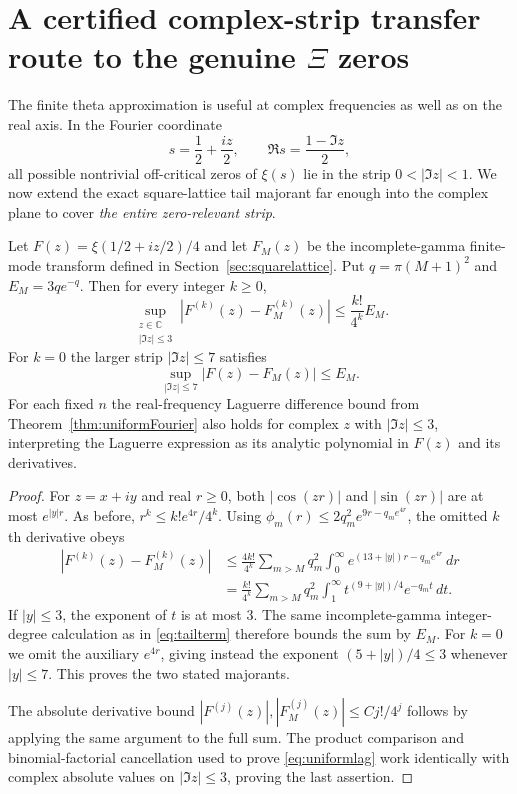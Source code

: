\section{A certified complex-strip transfer route to the genuine $\Xi$ zeros}
\label{sec:complexstrip}
The finite theta approximation is useful at complex
frequencies as well as on the real axis. In the
Fourier coordinate
\[
s=\frac12+\frac{iz}{2},
\qquad
\Re s=\frac{1-\Im z}{2},
\]
all possible nontrivial off-critical zeros of
$\xi(s)$ lie in the strip $0<|\Im z|<1$.
We now extend the exact square-lattice tail
majorant far enough into the complex plane
to cover \emph{the entire zero-relevant strip}.

\begin{theorem}\label{thm:complexstrip}
Let $F(z)=\xi(1/2+iz/2)/4$ and let $F_M(z)$
be the incomplete-gamma finite-mode transform
defined in Section~\ref{sec:squarelattice}.
Put $q=\pi(M+1)^2$ and
$E_M=3qe^{-q}$. Then for every integer
$k\ge0$,
\begin{equation}
\boxed{
\sup_{\substack{z\in\mathbb C\\|\Im z|\le3}}
|F^{(k)}(z)-F_M^{(k)}(z)|
\le\frac{k!}{4^k}E_M.
}
\label{eq:stripderivative}
\end{equation}
For $k=0$ the larger strip
$|\Im z|\le7$ satisfies
\begin{equation}
\boxed{
\sup_{|\Im z|\le7}|F(z)-F_M(z)|
\le E_M.
}
\label{eq:stripzero}
\end{equation}
For each fixed $n$ the real-frequency
Laguerre difference bound from
Theorem~\ref{thm:uniformFourier}
also holds for complex $z$ with
$|\Im z|\le3$, interpreting the
Laguerre expression as its analytic
polynomial in $F(z)$ and its derivatives.
\end{theorem}
\begin{proof}
For $z=x+iy$ and real $r\ge0$, both
$|\cos(zr)|$ and $|\sin(zr)|$ are
at most $e^{|y|r}$. As before,
$r^k\le k!e^{4r}/4^k$.
Using $\phi_m(r)\le
2q_m^2e^{9r-q_me^{4r}}$,
the omitted $k$th derivative obeys
\begin{align}
|F^{(k)}(z)-F_M^{(k)}(z)|
&\le \frac{4k!}{4^k}
\sum_{m>M}q_m^2
\int_0^\infty
e^{(13+|y|)r-q_me^{4r}}\,dr
\nonumber\\
&=\frac{k!}{4^k}
\sum_{m>M}q_m^2
\int_1^\infty
t^{(9+|y|)/4}e^{-q_mt}\,dt.
\label{eq:complexmajorant}
\end{align}
If $|y|\le3$, the exponent of $t$
is at most $3$.
The same incomplete-gamma
integer-degree calculation as in
\eqref{eq:tailterm} therefore bounds
the sum by $E_M$.
For $k=0$ we omit the auxiliary
$e^{4r}$, giving instead the exponent
$(5+|y|)/4\le3$ whenever $|y|\le7$.
This proves the two stated majorants.

The absolute derivative bound
$|F^{(j)}(z)|,|F_M^{(j)}(z)|
\le Cj!/4^j$ follows by applying
the same argument to the full sum.
The product comparison
and binomial-factorial cancellation
used to prove \eqref{eq:uniformlag}
work identically with complex
absolute values on $|\Im z|\le3$,
proving the last assertion.
\end{proof}

